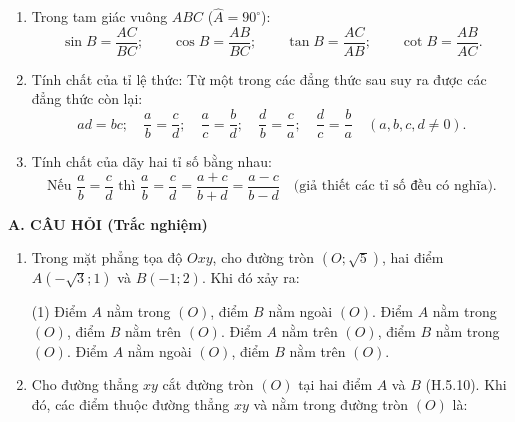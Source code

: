 \begin{practice}
\begin{enumerate}
        \item Trong tam giác vuông $ABC$ ($\widehat A=90^\circ$):
        \[
            \sin B=\dfrac{AC}{BC};\qquad
            \cos B=\dfrac{AB}{BC};\qquad
            \tan B=\dfrac{AC}{AB};\qquad
            \cot B=\dfrac{AB}{AC}.
        \]

        \item Tính chất của tỉ lệ thức: Từ một trong các đẳng thức sau suy ra được các đẳng thức còn lại:
        \[
            ad=bc;\quad
            \dfrac{a}{b}=\dfrac{c}{d};\quad
            \dfrac{a}{c}=\dfrac{b}{d};\quad
            \dfrac{d}{b}=\dfrac{c}{a};\quad
            \dfrac{d}{c}=\dfrac{b}{a}\quad (a,b,c,d\ne0).
        \]

        \item Tính chất của dãy hai tỉ số bằng nhau:
        \[
            \text{Nếu }\dfrac{a}{b}=\dfrac{c}{d}\text{ thì }
            \dfrac{a}{b}=\dfrac{c}{d}
            =\dfrac{a+c}{b+d}
            =\dfrac{a-c}{b-d}
            \quad\text{(giả thiết các tỉ số đều có nghĩa).}
        \]
    \end{enumerate}

    \textbf{A. CÂU HỎI (Trắc nghiệm)}

    \begin{enumerate}
        \item Trong mặt phẳng tọa độ $Oxy$, cho đường tròn $(O;\sqrt{5})$, hai điểm $A(-\sqrt{3};1)$ và $B(-1;2)$. Khi đó xảy ra:
        \begin{tasks}(1)
            \task[(A)] Điểm $A$ nằm trong $(O)$, điểm $B$ nằm ngoài $(O)$.
            \task[(B)] Điểm $A$ nằm trong $(O)$, điểm $B$ nằm trên $(O)$.
            \task[(C)] Điểm $A$ nằm trên $(O)$, điểm $B$ nằm trong $(O)$.
            \task[(D)] Điểm $A$ nằm ngoài $(O)$, điểm $B$ nằm trên $(O)$.
        \end{tasks}
        \par\noindent\answerbox\par

        \item Cho đường thẳng $xy$ cắt đường tròn $(O)$ tại hai điểm $A$ và $B$ (H.5.10). Khi đó, các điểm thuộc đường thẳng $xy$ và nằm trong đường tròn $(O)$ là:

        \begin{center}
\end{center}
\end{enumerate}
\end{practice}
